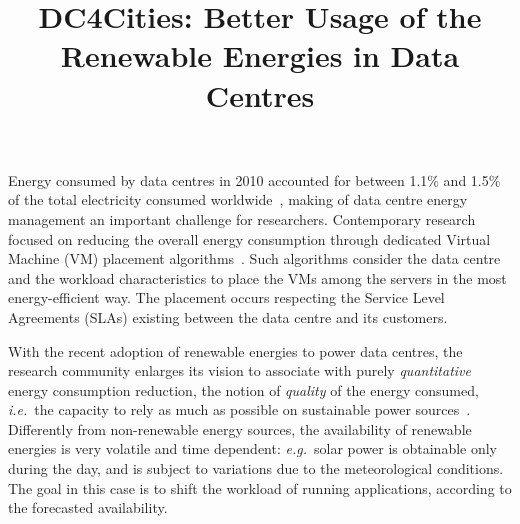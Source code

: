 \documentclass[conference]{IEEEtran}
\newcommand{\ie}{\emph{i.e.}}
\newcommand{\eg}{{\em e.g.}}
\begin{document}
\title{DC4Cities: Better Usage of the Renewable Energies in Data Centres}

\author{
\and
{}
\and
{}
}

\maketitle

Energy consumed by data centres in 2010 accounted for between 1.1\% and 1.5\% of the total electricity consumed worldwide~\cite{Koomey2011}, making of data centre energy ma\-nagement an important challenge for researchers.
Contemporary research focused on reducing the overall energy consumption through dedicated Virtual Machine (VM) placement algorithms~\cite{dupont-eenergy12}.
Such algorithms consider the data centre and the workload characteristics to place the VMs among the servers in the most energy-efficient way.
The placement occurs respecting the Service Level Agreements (SLAs) existing between the data centre and its customers.

With the recent adoption of renewable energies to power data centres, the research community enlarges its vision to associate with purely \emph{quantitative} energy consumption reduction, the notion of \emph{quality} of the energy consumed, \ie\ the capacity to rely as much as possible on sustainable power sources~\cite{parasol-sigplan2013}.
Differently from non-renewable energy sources, the availability of renewable energies is very volatile and time dependent: \eg\ solar power is obtainable only during the day, and is subject to variations due to the meteorological conditions.
The goal in this case is to shift the workload of running applications, according to the forecasted availability.
\end{document}

